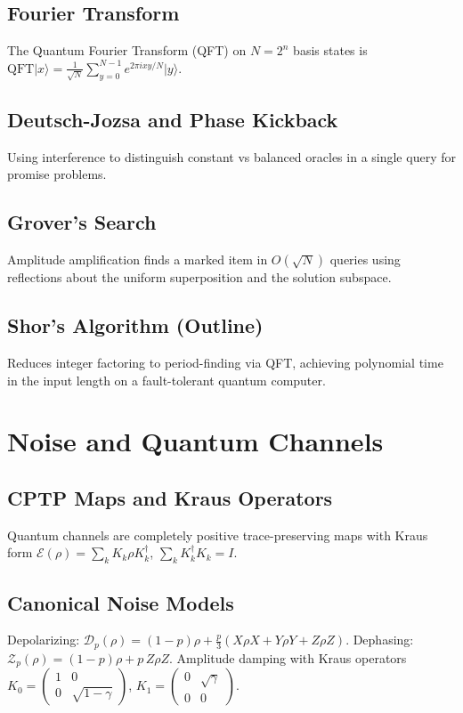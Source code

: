 \documentclass[11pt]{article}
\theoremstyle{definition}
\newcommand{\ket}[1]{\lvert #1 \rangle}
\begin{document}
\subsection{Fourier Transform}
The Quantum Fourier Transform (QFT) on $N=2^n$ basis states is $\mathrm{QFT}\ket{x}=\tfrac{1}{\sqrt{N}}\sum_{y=0}^{N-1} e^{2\pi i xy/N}\ket{y}$.

\subsection{Deutsch-Jozsa and Phase Kickback}
Using interference to distinguish constant vs balanced oracles in a single query for promise problems.

\subsection{Grover's Search}
Amplitude amplification finds a marked item in $O(\sqrt{N})$ queries using reflections about the uniform superposition and the solution subspace.

\subsection{Shor's Algorithm (Outline)}
Reduces integer factoring to period-finding via QFT, achieving polynomial time in the input length on a fault-tolerant quantum computer.

\section{Noise and Quantum Channels}

\subsection{CPTP Maps and Kraus Operators}
Quantum channels are completely positive trace-preserving maps with Kraus form $\mathcal{E}(\rho)=\sum_k K_k\rho K_k^{\dagger}$, $\sum_k K_k^{\dagger}K_k=I$.

\subsection{Canonical Noise Models}
Depolarizing: $\mathcal{D}_p(\rho)=(1-p)\rho+\tfrac{p}{3}(X\rho X+Y\rho Y+Z\rho Z)$. Dephasing: $\mathcal{Z}_p(\rho)=(1-p)\rho+p\,Z\rho Z$. Amplitude damping with Kraus operators $K_0=\begin{pmatrix}1&0\\0&\sqrt{1-\gamma}\end{pmatrix}$, $K_1=\begin{pmatrix}0&\sqrt{\gamma}\\0&0\end{pmatrix}$.
\end{document}
